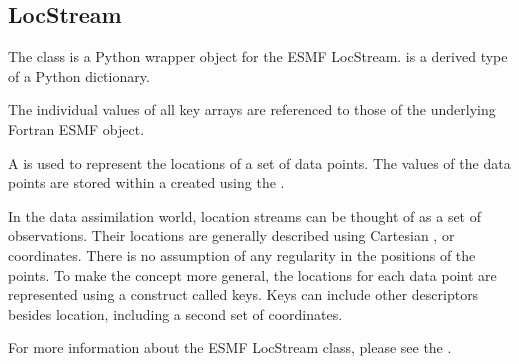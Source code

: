 \documentclass[letterpaper,10pt,english]{sphinxmanual}
\begin{document}
\subsection{LocStream}
\label{\detokenize{locstream:locstream}}\label{\detokenize{locstream::doc}}

\begin{fulllineitems}
\label{\detokenize{locstream:ESMF.api.locstream.LocStream}}
The {\hyperref[\detokenize{locstream:ESMF.api.locstream.LocStream}]{}} class is a Python wrapper object for the ESMF LocStream.
{\hyperref[\detokenize{locstream:ESMF.api.locstream.LocStream}]{}} is a derived type of a Python dictionary.

The individual values of all key arrays are referenced to those of the
underlying Fortran ESMF object.

A {\hyperref[\detokenize{locstream:ESMF.api.locstream.LocStream}]{}} is used to represent the locations of a
set of data points. The values of the data points are stored within a
{\hyperref[\detokenize{field:ESMF.api.field.Field}]{}} created using the {\hyperref[\detokenize{locstream:ESMF.api.locstream.LocStream}]{}}.

In the data assimilation world, location streams can be thought of as a set
of observations. Their locations are generally described using Cartesian
, or  coordinates. There is no assumption
of any regularity in the positions of the points. To make the concept more
general, the locations for each data point are represented using a construct
called keys. Keys can include other descriptors besides location, including
a second set of coordinates.

For more information about the ESMF LocStream class, please see the
.


\end{fulllineitems}
\end{document}
